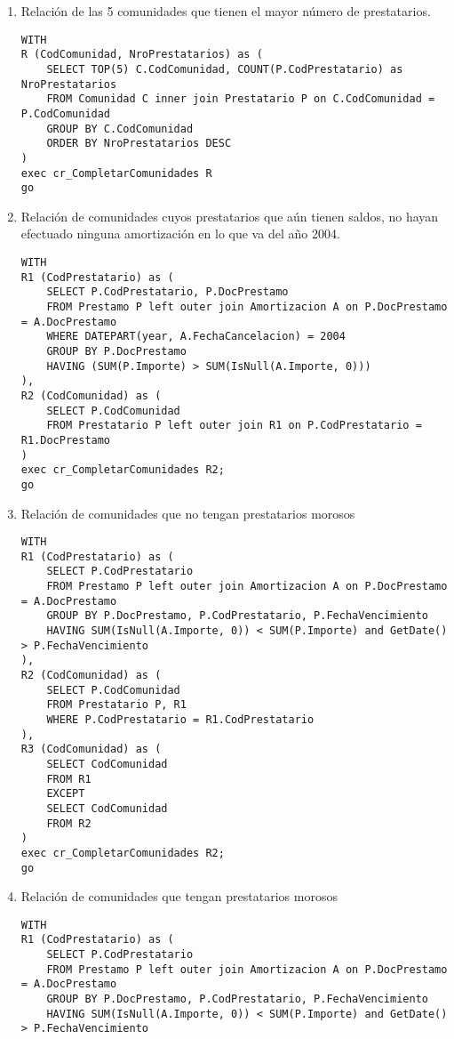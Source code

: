 \begin{enumerate}
\skiplines{}
\item Relación de las 5 comunidades que tienen el mayor número de prestatarios.

\begin{verbatim}
WITH
R (CodComunidad, NroPrestatarios) as (
    SELECT TOP(5) C.CodComunidad, COUNT(P.CodPrestatario) as NroPrestatarios
    FROM Comunidad C inner join Prestatario P on C.CodComunidad = P.CodComunidad
    GROUP BY C.CodComunidad
    ORDER BY NroPrestatarios DESC
)
exec cr_CompletarComunidades R
go
\end{verbatim}

\item Relación de comunidades cuyos prestatarios que aún tienen saldos, no hayan
efectuado ninguna amortización en lo que va del año 2004.

\begin{verbatim}
WITH
R1 (CodPrestatario) as (
    SELECT P.CodPrestatario, P.DocPrestamo
    FROM Prestamo P left outer join Amortizacion A on P.DocPrestamo = A.DocPrestamo
    WHERE DATEPART(year, A.FechaCancelacion) = 2004
    GROUP BY P.DocPrestamo
    HAVING (SUM(P.Importe) > SUM(IsNull(A.Importe, 0)))
),
R2 (CodComunidad) as (
    SELECT P.CodComunidad
    FROM Prestatario P left outer join R1 on P.CodPrestatario = R1.DocPrestamo
)
exec cr_CompletarComunidades R2;
go
\end{verbatim}

\item Relación de comunidades que no tengan prestatarios morosos

\begin{verbatim}
WITH
R1 (CodPrestatario) as (
    SELECT P.CodPrestatario
    FROM Prestamo P left outer join Amortizacion A on P.DocPrestamo = A.DocPrestamo
    GROUP BY P.DocPrestamo, P.CodPrestatario, P.FechaVencimiento
    HAVING SUM(IsNull(A.Importe, 0)) < SUM(P.Importe) and GetDate() > P.FechaVencimiento
),
R2 (CodComunidad) as (
    SELECT P.CodComunidad
    FROM Prestatario P, R1
    WHERE P.CodPrestatario = R1.CodPrestatario
),
R3 (CodComunidad) as (
    SELECT CodComunidad
    FROM R1
    EXCEPT
    SELECT CodComunidad
    FROM R2
)
exec cr_CompletarComunidades R2;
go
\end{verbatim}

\item Relación de comunidades que tengan prestatarios morosos

\begin{verbatim}
WITH
R1 (CodPrestatario) as (
    SELECT P.CodPrestatario
    FROM Prestamo P left outer join Amortizacion A on P.DocPrestamo = A.DocPrestamo
    GROUP BY P.DocPrestamo, P.CodPrestatario, P.FechaVencimiento
    HAVING SUM(IsNull(A.Importe, 0)) < SUM(P.Importe) and GetDate() > P.FechaVencimiento


\end{verbatim}
\end{enumerate}
